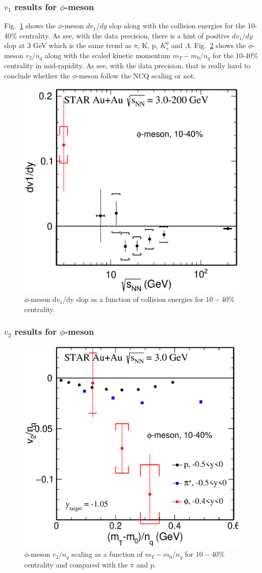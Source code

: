 \subsubsection{$v_1$ results for $\phi$-meson}

Fig.~\ref{phi_dv1dy_energy} shows the $\phi$-meson $dv_1/dy$ slop along with the collision energies for the 10-40\% centrality. As see, with the data precision, there is a hint of positive $dv_1/dy$ slop at 3 GeV which is the same trend as $\pi$, K, p, $K_{s}^0$ and $\Lambda$. Fig.~\ref{phi_v2_pT} shows the $\phi$-meson $v_2/n_q$ along with the scaled kinetic momentum $m_T-m_0/n_q$ for the 10-40\% centrality in mid-rapidity. As see, with the data precision, that is really hard to conclude whether the $\phi$-meson follow the NCQ scaling or not.

\begin{figure}[h]
\includegraphics[width=0.6\linewidth]{chapterY/fig/Fffig_dv1_vs_sNN.eps}
\caption{$\phi$-meson d$v_1$/dy slop as a function of collision energies for $10-40\%$ centrality.}
\label{phi_dv1dy_energy}
\end{figure}

\subsubsection{$v_2$ results for $\phi$-meson}

\begin{figure}[h]
\includegraphics[width=0.6\linewidth]{chapterY/fig/Fffig_v2NCQ_y00p4.eps}
\caption{$\phi$-meson $v_2$/$n_q$ scaling as a function of $m_T-m_0$/$n_q$ for $10-40\%$ centrality and compared with the $\pi$ and p.}
\label{phi_v2_pT}
\end{figure}
